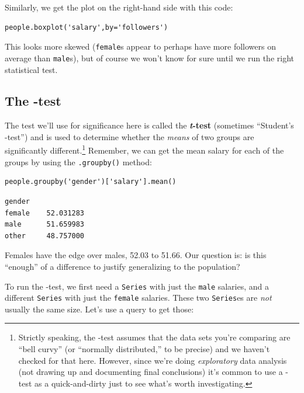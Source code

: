 Similarly, we get the plot on the right-hand side with this code:

\begin{Verbatim}[fontsize=\small,samepage=true,frame=single,framesep=3mm]
people.boxplot('salary',by='followers')
\end{Verbatim}

This looks more skewed (\texttt{female}s appear to perhaps have more followers
on average than \texttt{male}s), but of course we won't know for sure until we
run the right statistical test.

\subsection{The -test}


The test we'll use for significance here is called the \textbf{\textit{t}-test}
(sometimes ``Student's -test'') and is used to determine whether the
\textit{means} of two groups are significantly different.\footnote{Strictly
speaking, the -test assumes that the data sets you're comparing are ``bell
curvy'' (or ``normally distributed,'' to be precise) and we haven't checked for
that here. However, since we're doing \textit{exploratory} data analysis (not
drawing up and documenting final conclusions) it's common to use a -test as
a quick-and-dirty just to see what's worth investigating.} Remember, we can get
the mean salary for each of the groups by using the \texttt{.groupby()} method:

\begin{Verbatim}[fontsize=\small,samepage=true,frame=single,framesep=3mm]
people.groupby('gender')['salary'].mean()
\end{Verbatim}
\vspace{-.2in}

\begin{Verbatim}[fontsize=\small,samepage=true,frame=leftline,framesep=5mm,framerule=1mm]
gender
female    52.031283
male      51.659983
other     48.757000
\end{Verbatim}

Females have the edge over males, 52.03 to 51.66. Our question is: is this
``enough'' of a difference to justify generalizing to the population?

To run the -test, we first need a \texttt{Series} with just the
\texttt{male} salaries, and a different \texttt{Series} with just the
\texttt{female} salaries. These two \texttt{Series}es are \textit{not} usually
the same size. Let's use a query to get those:

